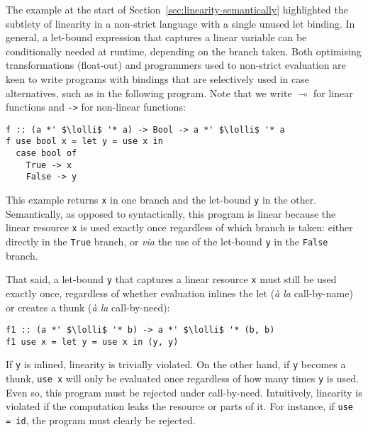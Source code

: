 \documentclass[acmsmall,review,screen]{acmart}
\newcommand{\lolli}{\multimap}
\begin{document}
The example at the start of Section~\ref{sec:linearity-semantically}
highlighted the subtlety of linearity in a non-strict language with
a single unused let binding.
%
In general, a let-bound expression that captures a linear variable
can be conditionally needed at runtime, depending on the branch taken.
Both optimising transformations (float-out) and programmers used to
non-strict evaluation are keen to write programs with bindings that are selectively
used in case alternatives, such as in the following program. Note that we write
$\lolli$ for linear functions and \lstinline{->} for non-linear functions:
%
\begin{notyet}
\begin{lstlisting}
f :: (a *' $\lolli$ '* a) -> Bool -> a *' $\lolli$ '* a
f use bool x = let y = use x in
  case bool of
    True -> x 
    False -> y
\end{lstlisting}
\end{notyet}
%
This example returns \lstinline{x} in one branch and the let-bound
\lstinline{y} in the other. Semantically, as opposed to syntactically, this
program is linear %
because the linear resource \lstinline{x} is used exactly once regardless of which branch is
taken: either directly in the \lstinline{True} branch, or \emph{via}
the use of the let-bound \lstinline{y} in the \lstinline{False} branch.

That said, a let-bound \lstinline{y} that captures a linear resource
\lstinline{x} must still be used exactly once, regardless of whether evaluation
inlines the let (\emph{à la} call-by-name) or creates a thunk (\emph{à
  la} call-by-need):
%
%
\begin{noway}
\begin{lstlisting}
f1 :: (a *' $\lolli$ '* b) -> a *' $\lolli$ '* (b, b)
f1 use x = let y = use x in (y, y)
\end{lstlisting}
\end{noway}
%
If \lstinline{y} is inlined, linearity is trivially violated.
%
On the other hand, if \lstinline{y} becomes a thunk, \lstinline{use x} will
only be evaluated once regardless of how many times \lstinline{y} is used.
Even so, this program must be rejected under call-by-need.
%
Intuitively, linearity is violated if the computation leaks the resource or
parts of it. For instance, if \lstinline{use = id}, the program must clearly be
rejected.
%
%
%
\end{document}
